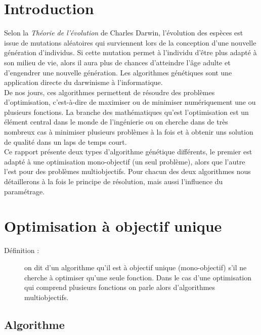 \documentclass[12pt]{report}
\begin{document}
  \chapter{Introduction}
    Selon la \emph{Théorie de l'évolution} \cite{darwin} de Charles Darwin, l'évolution des espèces est issue de mutations aléatoires qui surviennent lors de la conception d'une nouvelle génération d'individus. Si cette mutation permet à l'individu d'être plus adapté à son milieu de vie, alors il aura plus de chances d'atteindre l'âge adulte et d'engendrer une nouvelle génération.
    Les algorithmes génétiques sont une application directe du darwinisme à l'informatique.\\
    De nos jours, ces algorithmes permettent de résoudre des problèmes d'optimisation, c'est-à-dire de maximiser ou de minimiser numériquement une ou plusieurs fonctions.
    La branche des mathématiques qu'est l'optimisation est un élément central dans le monde de l'ingénierie ou on cherche dans de très nombreux cas à minimiser plusieurs problèmes à la fois et à obtenir uns solution de qualité dans un laps de temps court.\\
    Ce rapport présente deux types d'algorithme génétique différents, le premier est adapté à une optimisation mono-objectif (un seul problème), alors que l'autre l'est pour des problèmes multiobjectifs. Pour chacun des deux algorithmes nous détaillerons à la fois le principe de résolution, mais aussi l'influence du paramétrage.

  \tableofcontents
  \chapter{Optimisation à objectif unique}
    \begin{description}
      \item[Définition :] on dit d'un algorithme qu'il est à objectif unique (mono-objectif) s'il ne cherche à optimiser qu'une seule fonction. Dans le cas d'une optimisation qui comprend plusieurs fonctions on parle alors d'algorithmes multiobjectifs.
    \end{description}
    \section{Algorithme}
\end{document}

